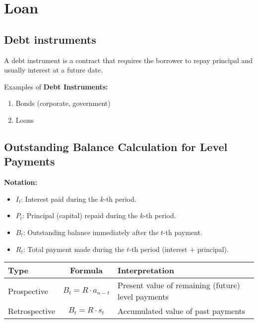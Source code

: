 \chapter{Loan}

\section{Debt instruments}

\begin{definition}
A debt instrument is a contract that requires the borrower to repay principal and usually interest at a future date.
\end{definition}

\begin{comments}
    Examples of \textbf{Debt Instruments:}
    \begin{enumerate}
        \item Bonds (corporate, government)
        \item Loans
    \end{enumerate}
\end{comments}

\section{Outstanding Balance Calculation for Level Payments}    

\textbf{Notation:}
\begin{itemize}
    \item \( I_t \): Interest paid during the \( k \)-th period.
    \item \( P_t \): Principal (capital) repaid during the \( k \)-th period.
    \item \( B_t \): Outstanding balance immediately after the \( t \)-th payment.
    \item \( R_t \): Total payment made during the \( t \)-th period (interest + principal).
\end{itemize}

\begin{center}
\renewcommand{\arraystretch}{1.5}
\begin{tabular}{@{} l c l @{}}
\toprule
\textbf{Type} & \textbf{Formula} & \textbf{Interpretation} \\
\midrule
Prospective   & \( B_t = R \cdot a_{n - t} \) & Present value of remaining (future) level payments \\
Retrospective & \( B_t = R \cdot s_t \)       & Accumulated value of past payments \\
\bottomrule
\end{tabular}
\end{center}

